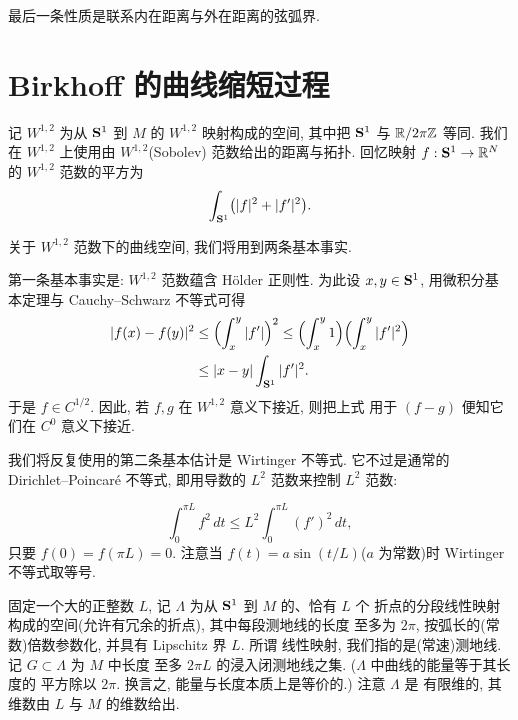 最后一条性质是联系内在距离与外在距离的弦弧界.

\section{Birkhoff 的曲线缩短过程}
\label{sec:5.2}

记 $W^{1,2}$ 为从 $\mathbf{S}^1$ 到 $M$ 的 $W^{1,2}$ 映射构成的空间, 其中把
$\mathbf{S}^1$ 与 $\mathbb{R}/2\pi\mathbb{Z}$ 等同. 我们在 $W^{1,2}$ 上使用由
$W^{1,2}$(Sobolev) 范数给出的距离与拓扑. 回忆映射 $f:\mathbf{S}^1\to\mathbb{R}^N$ 的
$W^{1,2}$ 范数的平方为
\begin{equation*}
\int_{\mathbf{S}^1}\bigl(|f|^2+|f'|^2\bigr).
\end{equation*}

关于 $W^{1,2}$ 范数下的曲线空间, 我们将用到两条基本事实.

第一条基本事实是: $W^{1,2}$ 范数蕴含 H\"older 正则性. 为此设
$x,y\in\mathbf{S}^1$, 用微积分基本定理与 Cauchy--Schwarz 不等式可得
\begin{equation}
\begin{aligned}
|f(x)-f(y)|^2
&\leq\Bigl(\int_x^y|f'|\Bigr)^2\leq\Bigl(\int_x^y 1\Bigr)
 \Bigl(\int_x^y|f'|^2\Bigr)\\
&\leq|x-y|\int_{\mathbf{S}^1}|f'|^2.
\end{aligned}
\label{eq:5.1}
\end{equation}
于是 $f\in C^{1/2}$. 因此, 若 $f,g$ 在 $W^{1,2}$ 意义下接近, 则把上式
用于 $(f-g)$ 便知它们在 $C^0$ 意义下接近.

{\setlength{\emergencystretch}{2em}%
我们将反复使用的第二条基本估计是 Wirtinger 不等式. 它不过是通常的
Dirichlet--Poincar\'e 不等式, 即用导数的 $L^2$ 范数来控制 $L^2$ 范数:\par}
\begin{equation*}
\int_0^{\pi L}f^2\,dt\leq L^2\int_0^{\pi L}(f')^2\,dt,
\end{equation*}
只要 $f(0)=f(\pi L)=0$. 注意当 $f(t)=a\sin(t/L)$($a$ 为常数)时 Wirtinger
不等式取等号.

固定一个大的正整数 $L$, 记 $\Lambda$ 为从 $\mathbf{S}^1$ 到 $M$ 的、恰有 $L$ 个
折点的分段线性映射构成的空间(允许有冗余的折点), 其中每段测地线的长度
至多为 $2\pi$, 按弧长的(常数)倍数参数化, 并具有 Lipschitz 界 $L$. 所谓
线性映射, 我们指的是(常速)测地线. 记 $G\subset\Lambda$ 为 $M$ 中长度
至多 $2\pi L$ 的浸入闭测地线之集. ($\Lambda$ 中曲线的能量等于其长度的
平方除以 $2\pi$. 换言之, 能量与长度本质上是等价的.) 注意 $\Lambda$ 是
有限维的, 其维数由 $L$ 与 $M$ 的维数给出.

